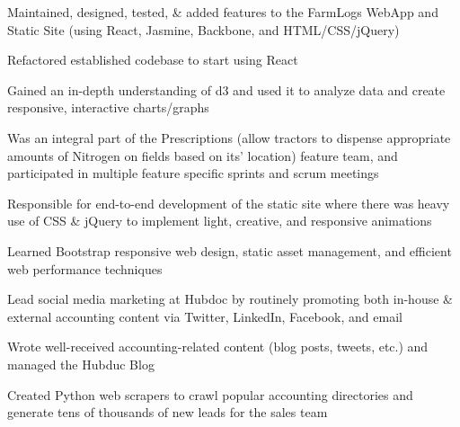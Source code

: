 \documentclass[letterpaper]{deedy-resume} %
\begin{document}
\begin{minipage}[t]{0.66\textwidth}

  \begin{tightitemize}
  \item Maintained, designed, tested, \& added features to the FarmLogs WebApp and Static Site (using React, Jasmine, Backbone, and HTML/CSS/jQuery)
  \item Refactored established codebase to start using React
  \item Gained an in-depth understanding of d3 and used it to analyze data and create responsive, interactive charts/graphs
  \item Was an integral part of the Prescriptions (allow tractors to dispense appropriate amounts of Nitrogen on fields based on its' location) feature team, and participated in multiple feature specific sprints and scrum meetings
  \end{tightitemize}

  \sectionspace %



  \begin{tightitemize}
  \item Responsible for end-to-end development of the static site where there was heavy use of CSS \& jQuery to implement light, creative, and responsive animations
  \item Learned Bootstrap responsive web design, static asset management, and efficient web performance techniques
  \item Lead social media marketing at Hubdoc by routinely promoting both in-house \& external accounting content via Twitter, LinkedIn, Facebook, and email
  \item Wrote well-received accounting-related content (blog posts, tweets, etc.) and managed the Hubduc Blog
  \item Created Python web scrapers to crawl popular accounting directories and generate tens of thousands of new leads for the sales team
  \end{tightitemize}

  \sectionspace %
  


\end{minipage}
\end{document}
